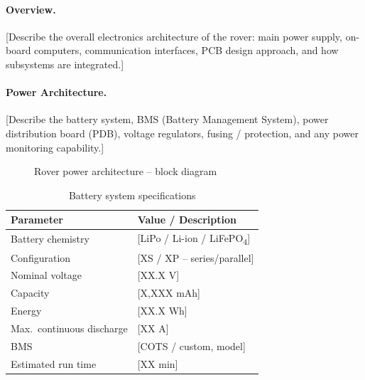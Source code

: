 %

\paragraph{Overview.}
[Describe the overall electronics architecture of the rover: main power supply,
on-board computers, communication interfaces, PCB design approach, and how
subsystems are integrated.]

\paragraph{Power Architecture.}
[Describe the battery system, BMS (Battery Management System), power
distribution board (PDB), voltage regulators, fusing / protection, and any
power monitoring capability.]

\begin{figure}[H]
    \centering
    \caption{Rover power architecture -- block diagram}
    \label{fig:power_arch}
\end{figure}

\begin{table}[H]
    \centering
    \caption{Battery system specifications}
    \label{tab:battery_specs}
    \begin{tabular}{L{5cm} L{7cm}}
        \toprule
        \textbf{Parameter}            & \textbf{Value / Description} \\
        \midrule
        Battery chemistry             & [LiPo / Li-ion / LiFePO\textsubscript{4}] \\
        Configuration                 & [XS / XP -- series/parallel] \\
        Nominal voltage               & [XX.X V] \\
        Capacity                      & [X,XXX mAh] \\
        Energy                        & [XX.X Wh] \\
        Max.\ continuous discharge    & [XX A] \\
        BMS                           & [COTS / custom, model] \\
        Estimated run time            & [XX min] \\
        \bottomrule
    \end{tabular}
\end{table}

